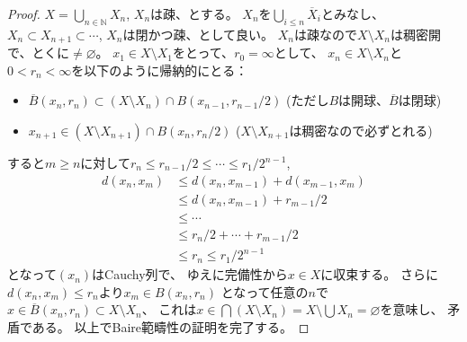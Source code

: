 \documentclass[uplatex]{jsarticle}
\theoremstyle{definition}
\renewcommand{\emptyset}{\varnothing}
\newcommand{\N}{\mathbb{N}}
\begin{document}
\begin{proof}
  \(X=\bigcup_{n\in \N} X_n\), \(X_n\)は疎、とする。
  \(X_n\)を\(\bigcup_{i\leq n}\overline{X}_i\)とみなし、
  \(X_n\subset X_{n+1}\subset \cdots\), \(X_n\)は閉かつ疎、として良い。
  \(X_n\)は疎なので\(X\setminus X_n\)は稠密開で、とくに\(\neq \emptyset\)。
  \(x_1\in X\setminus X_1\)をとって、\(r_0 = \infty\)として、
  \(x_n\in X\setminus X_n\)と\(0 < r_n < \infty\)を以下のように帰納的にとる：
  \begin{itemize}
    \item
    \(\overline{B}(x_n,r_n)\subset (X\setminus X_n)\cap B(x_{n-1},r_{n-1}/2)\)
    (ただし\(B\)は開球、\(\overline{B}\)は閉球)
    \item
    \(x_{n+1}\in (X\setminus X_{n+1})\cap B(x_n,r_n/2)\)
    (\(X\setminus X_{n+1}\)は稠密なので必ずとれる)
  \end{itemize}
  すると\(m\geq n\)に対して\(r_n \leq r_{n-1}/2 \leq \cdots \leq r_1/2^{n-1}\),
  \begin{align*}
    d(x_n,x_m)&\leq d(x_n,x_{m-1}) + d(x_{m-1},x_m) \\
    &\leq d(x_n,x_{m-1}) + r_{m-1}/2 \\
    &\leq \cdots \\
    &\leq r_n/2 + \cdots + r_{m-1}/2 \\
    &\leq r_n \leq r_1/2^{n-1}
  \end{align*}
  となって\((x_n)\)はCauchy列で、
  ゆえに完備性から\(x\in X\)に収束する。
  さらに\(d(x_n,x_m) \leq r_n\)より\(x_m\in B(x_n,r_n)\)
  となって任意の\(n\)で\(x\in \overline{B}(x_n,r_n)\subset X\setminus X_n\)、
  これは\(x\in \bigcap (X\setminus X_n) = X\setminus \bigcup X_n = \emptyset\)を意味し、
  矛盾である。
  以上でBaire範疇性の証明を完了する。
\end{proof}
\end{document}
